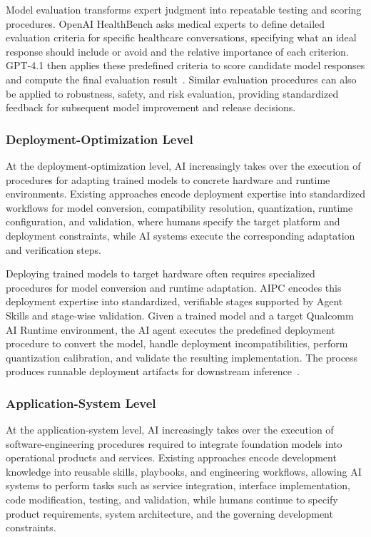 Model evaluation transforms expert judgment into repeatable testing and scoring procedures. OpenAI HealthBench asks medical experts to define detailed evaluation criteria for specific healthcare conversations, specifying what an ideal response should include or avoid and the relative importance of each criterion. GPT-4.1 then applies these predefined criteria to score candidate model responses and compute the final evaluation result~\cite{healthbench}. Similar evaluation procedures can also be applied to robustness, safety, and risk evaluation, providing standardized feedback for subsequent model improvement and release decisions.

\subsubsection{Deployment-Optimization Level}
At the deployment-optimization level, AI increasingly takes over the execution of procedures for adapting trained models to concrete hardware and runtime environments. Existing approaches encode deployment expertise into standardized workflows for model conversion, compatibility resolution, quantization, runtime configuration, and validation, where humans specify the target platform and deployment constraints, while AI systems execute the corresponding adaptation and verification steps.

Deploying trained models to target hardware often requires specialized procedures for model conversion and runtime adaptation. AIPC encodes this deployment expertise into standardized, verifiable stages supported by Agent Skills and stage-wise validation. Given a trained model and a target Qualcomm AI Runtime environment, the AI agent executes the predefined deployment procedure to convert the model, handle deployment incompatibilities, perform quantization calibration, and validate the resulting implementation. The process produces runnable deployment artifacts for downstream inference~\cite{su2026aipc}.

\subsubsection{Application-System Level}
At the application-system level, AI increasingly takes over the execution of software-engineering procedures required to integrate foundation models into operational products and services. Existing approaches encode development knowledge into reusable skills, playbooks, and engineering workflows, allowing AI systems to perform tasks such as service integration, interface implementation, code modification, testing, and validation, while humans continue to specify product requirements, system architecture, and the governing development constraints.

